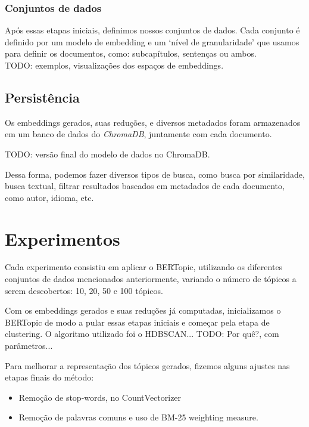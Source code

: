 \subsubsection{Conjuntos de dados}
Após essas etapas iniciais, definimos nossos conjuntos de dados. Cada conjunto é definido por um modelo de embedding e um `nível de granularidade' que usamos para definir os documentos, como: subcapítulos, sentenças ou ambos.\\
TODO: exemplos, visualizações dos espaços de embeddings.

\subsection{Persistência}
Os embeddings gerados, suas reduções, e diversos metadados foram armazenados em um banco de dados do \textit{ChromaDB}, juntamente com cada documento.

TODO: versão final do modelo de dados no ChromaDB.

Dessa forma, podemos fazer diversos tipos de busca, como busca por similaridade, busca textual, filtrar resultados baseados em metadados de cada documento, como autor, idioma, etc.

\section{Experimentos}
Cada experimento consistiu em aplicar o BERTopic, utilizando os diferentes conjuntos de dados mencionados anteriormente, variando o número de tópicos a serem descobertos: 10, 20, 50 e 100 tópicos.

Com os embeddings gerados e suas reduções já computadas, inicializamos o BERTopic de modo a pular essas etapas iniciais e começar pela etapa de clustering. O algoritmo utilizado foi o HDBSCAN... TODO: Por quê?, com parâmetros...

Para melhorar a representação dos tópicos gerados, fizemos alguns ajustes nas etapas finais do método:
\begin{itemize}
    \item Remoção de stop-words, no CountVectorizer
    \item Remoção de palavras comuns e uso de BM-25 weighting measure.
\end{itemize}
